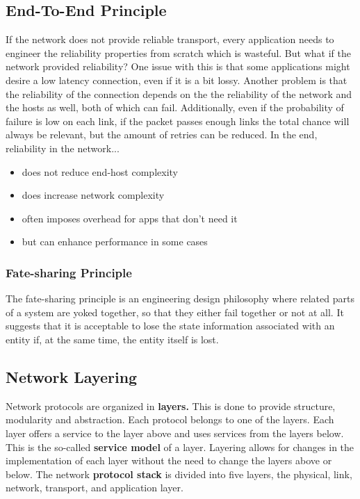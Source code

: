 \subsection{End-To-End Principle}
If the network does not provide reliable transport, every application needs to engineer the reliability properties from scratch which is wasteful. But what if the network provided reliability? One issue with this is that some applications might desire a low latency connection, even if it is a bit lossy. Another problem is that the reliability of the connection depends on the the reliability of the network and the hosts as well, both of which can fail. Additionally, even if the probability of failure is low on each link, if the packet passes enough links the total chance will always be relevant, but the amount of retries can be reduced. In the end, reliability in the network...
\begin{itemize}
\item does not reduce end-host complexity
\item does increase network complexity
\item often imposes overhead for apps that don't need it
\item but can enhance performance in some cases
\end{itemize}

\subsubsection{Fate-sharing Principle}
The fate-sharing principle is an engineering design philosophy where related parts of a system are yoked together, so that they either fail together or not at all. It suggests that it is acceptable to lose the state information associated with an entity if, at the same time, the entity itself is lost.

\subsection{Network Layering}
Network protocols are organized in \textbf{layers.} This is done to provide structure, modularity and abstraction. Each protocol belongs to one of the layers. Each layer offers a service to the layer above and uses services from the layers below. This is the so-called \textbf{service model} of a layer. Layering allows for changes in the implementation of each layer without the need to change the layers above or below. The network \textbf{protocol stack} is divided into five layers, the physical, link, network, transport, and application layer.

